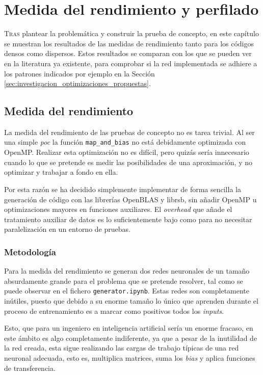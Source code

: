 \chapter{Medida del rendimiento y perfilado}
\label{chap:medida_rendimiento_perfilado}

\lettrine{T}{ras} plantear la problemática y construir la prueba de concepto, en este capítulo se muestran los resultados de las medidas de rendimiento tanto para los códigos densos como dispersos. Estos resultados se comparan con los que se pueden ver en la literatura ya existente, para comprobar si la red implementada se adhiere a los patrones indicados por ejemplo en la Sección \ref{sec:investigacion_optimizaciones_propuestas}.

\section{Medida del rendimiento}
\label{sec:medida_del_rendimiento}
La medida del rendimiento de las pruebas de concepto no es tarea trivial. Al ser una simple \textit{\acrlong{poc}} la función \texttt{map\_and\_bias} no está debidamente optimizada con OpenMP. Realizar esta optimización no es difícil, pero quizás sería innecesario cuando lo que se pretende es medir las posibilidades de una aproximación, y no optimizar y trabajar a fondo en ella.

Por esta razón se ha decidido simplemente implementar de forma sencilla la generación de código con las librerías OpenBLAS y librsb, sin añadir OpenMP u optimizaciones mayores en funciones auxiliares. El \textit{overhead} que añade el tratamiento auxiliar de datos es lo suficientemente bajo como para no necesitar paralelización en un entorno de pruebas.

\subsection{Metodología}
\label{ssec:metodologia}
Para la medida del rendimiento se generan dos redes neuronales de un tamaño absurdamente grande para el problema que se pretende resolver, tal como se puede observar en el fichero \texttt{generator.ipynb}. Estas redes son completamente inútiles, puesto que debido a su enorme tamaño lo único que aprenden durante el proceso de entrenamiento es a marcar como positivos todos los \textit{inputs}.

Esto, que para un ingeniero en inteligencia artificial sería un enorme fracaso, en este ámbito es algo completamente indiferente, ya que a pesar de la inutilidad de la red creada, esta sigue realizando las cargas de trabajo típicas de una red neuronal adecuada, esto es, multiplica matrices, suma los \textit{bias} y aplica funciones de transferencia.

